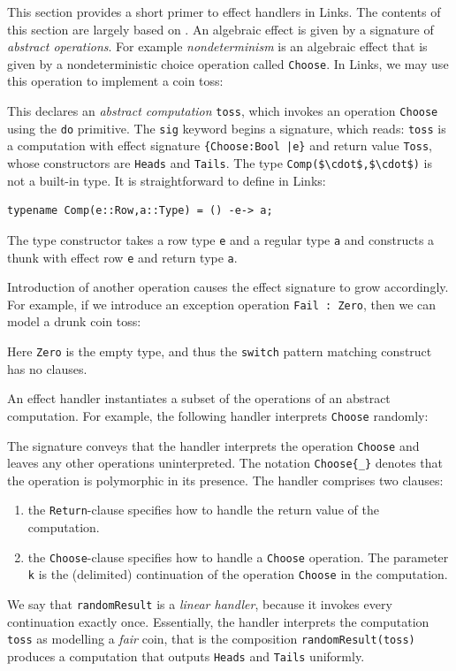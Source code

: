 \documentclass[12pt,mscres,cdtppar,twoside,openright,logo,rightchapter,normalheadings]{infthesis}
\newcommand{\snippet}[1]{}
\theoremstyle{definition}
\begin{document}
This section provides a short primer to effect handlers in Links. The
contents of this section are largely based on
\cite{Hillerstrom2016b}. An algebraic effect is given by a signature
of \emph{abstract operations}. For example \emph{nondeterminism} is an
algebraic effect that is given by a nondeterministic choice operation
called \lstinline$Choose$. In Links, we may use this operation to
implement a coin toss:
%
\snippet{toss.links}
%
This declares an \emph{abstract computation} \lstinline$toss$, which
invokes an operation \lstinline$Choose$ using the \lstinline$do$
primitive.  The \lstinline$sig$ keyword begins a signature, which
reads: \lstinline$toss$ is a computation with effect signature
\lstinline${Choose:Bool |e}$ and return value \lstinline$Toss$, whose
constructors are \lstinline$Heads$ and \lstinline$Tails$.  
The type \lstinline[mathescape]!Comp($\cdot$,$\cdot$)! is not a
built-in type. It is straightforward to define in Links:
%
\begin{lstlisting}
typename Comp(e::Row,a::Type) = () -e-> a;
\end{lstlisting}
%
The type constructor takes a row type \lstinline$e$ and a regular type
\lstinline$a$ and constructs a thunk with effect row \lstinline$e$ and
return type \lstinline$a$.

Introduction of another operation causes the effect signature to grow
accordingly. For example, if we introduce an exception operation
\lstinline$Fail : Zero$, then we can model a drunk coin toss:
%
\snippet{drunkToss.links}
%
Here \lstinline$Zero$ is the empty type, and thus the
\lstinline$switch$ pattern matching construct has no clauses.

An effect handler instantiates a subset of the operations of an
abstract computation. For example, the following handler interprets
\lstinline$Choose$ randomly:
%
\snippet{randomResult.links}
%
The signature conveys that the handler interprets the operation
\lstinline$Choose$ and leaves any other operations uninterpreted. The
notation \lstinline$Choose{_}$ denotes that the operation is
polymorphic in its presence.  The handler comprises two clauses:
\begin{enumerate}
  \item the \lstinline$Return$-clause specifies how to handle the return
    value of the computation.
  \item the \lstinline$Choose$-clause specifies how to handle a
    \lstinline$Choose$ operation. The parameter \lstinline$k$ is the
    (delimited) continuation of the operation \lstinline$Choose$ in the
    computation.
\end{enumerate}
We say that \lstinline$randomResult$ is a \emph{linear handler},
because it invokes every continuation exactly once.  Essentially, the
handler interprets the computation \lstinline$toss$ as modelling a
\emph{fair} coin, that is the composition
\lstinline$randomResult(toss)$ produces a computation that outputs
\lstinline$Heads$ and \lstinline$Tails$ uniformly.
\end{document}
